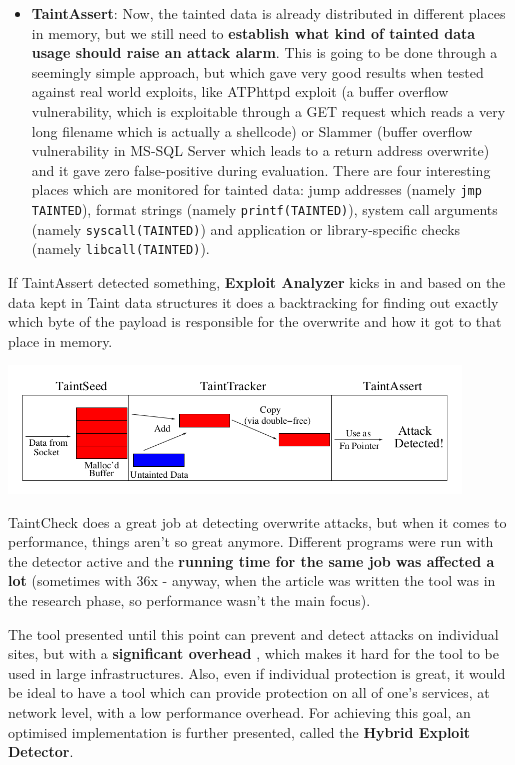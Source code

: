 \documentclass[10pt,a4paper,english,onecolumn]{IEEEtran}
\begin{document}
\begin{itemize}
    \item \textbf{TaintAssert}: Now, the tainted data is already distributed in different places in memory, but we still need to \textbf{establish what kind of tainted data usage should raise an attack alarm}. This is going to be done through a seemingly simple approach, but which gave very good results when tested against real world exploits, like ATPhttpd exploit (a buffer overflow vulnerability, which is exploitable through a GET request which reads a very long filename which is actually a shellcode) or Slammer (buffer overflow vulnerability in MS-SQL Server which leads to a return address overwrite) and it gave zero false-positive during evaluation. There are four interesting places which are monitored for tainted data: jump addresses (namely \texttt{jmp TAINTED}), format strings (namely \texttt{printf(TAINTED)}), system call arguments (namely \texttt{syscall(TAINTED)}) and application or library-specific checks (namely \texttt{libcall(TAINTED)}).
\end{itemize}

If TaintAssert detected something, \textbf{Exploit Analyzer} kicks in and based on the data kept in Taint data structures it does a backtracking for finding out exactly which byte of the payload is responsible for the overwrite and how it got to that place in memory.

\begin{center}
    \includegraphics[width=12cm]{images/taintcheck.png}
    \vspace{0.5cm}
\end{center}

TaintCheck does a great job at detecting overwrite attacks, but when it comes to performance, things aren't so great anymore. Different programs were run with the detector active and the \textbf{running time for the same job was affected a lot} (sometimes with 36x - anyway, when the article was written the tool was in the research phase, so performance wasn't the main focus).

The tool presented until this point can prevent and detect attacks on individual sites, but with a \textbf{significant overhead} , which makes it hard for the tool to be used in large infrastructures. Also, even if individual protection is great, it would be ideal to have a tool which can provide protection on all of one's services, at network level, with a low performance overhead. For achieving this goal, an optimised implementation is further presented, called the \textbf{Hybrid Exploit Detector}.
\end{document}
